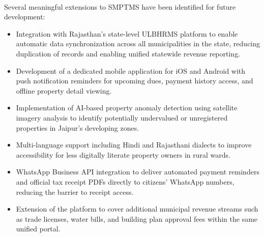 \paragraph{}Several meaningful extensions to SMPTMS have been identified for future development:
\begin{itemize}
 \item Integration with Rajasthan's state-level ULBHRMS platform to enable automatic data synchronization across all municipalities in the state, reducing duplication of records and enabling unified statewide revenue reporting.
 \item Development of a dedicated mobile application for iOS and Android with push notification reminders for upcoming dues, payment history access, and offline property detail viewing.
 \item Implementation of AI-based property anomaly detection using satellite imagery analysis to identify potentially undervalued or unregistered properties in Jaipur's developing zones.
 \item Multi-language support including Hindi and Rajasthani dialects to improve accessibility for less digitally literate property owners in rural wards.
 \item WhatsApp Business API integration to deliver automated payment reminders and official tax receipt PDFs directly to citizens' WhatsApp numbers, reducing the barrier to receipt access.
 \item Extension of the platform to cover additional municipal revenue streams such as trade licenses, water bills, and building plan approval fees within the same unified portal.
\end{itemize}
